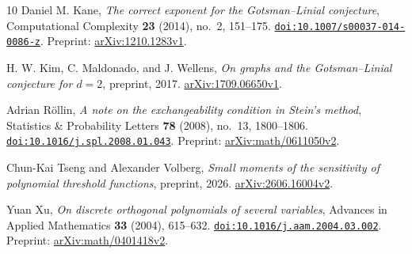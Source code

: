 \begin{thebibliography}{10}
Daniel M. Kane,
\emph{The correct exponent for the Gotsman--Linial conjecture},
Computational Complexity \textbf{23} (2014), no.~2, 151--175.
\href{https://doi.org/10.1007/s00037-014-0086-z}{\nolinkurl{doi:10.1007/s00037-014-0086-z}}.
Preprint: \href{https://arxiv.org/abs/1210.1283v1}{arXiv:1210.1283v1}.

H. W. Kim, C. Maldonado, and J. Wellens,
\emph{On graphs and the Gotsman--Linial conjecture for $d=2$},
preprint, 2017.
\href{https://arxiv.org/abs/1709.06650v1}{arXiv:1709.06650v1}.

Adrian R\"ollin,
\emph{A note on the exchangeability condition in Stein's method},
Statistics \& Probability Letters \textbf{78} (2008), no.~13, 1800--1806.
\href{https://doi.org/10.1016/j.spl.2008.01.043}{\nolinkurl{doi:10.1016/j.spl.2008.01.043}}.
Preprint: \href{https://arxiv.org/abs/math/0611050v2}{arXiv:math/0611050v2}.

Chun-Kai Tseng and Alexander Volberg,
\emph{Small moments of the sensitivity of polynomial threshold functions},
preprint, 2026.
\href{https://arxiv.org/abs/2606.16004v2}{arXiv:2606.16004v2}.

Yuan Xu,
\emph{On discrete orthogonal polynomials of several variables},
Advances in Applied Mathematics \textbf{33} (2004), 615--632.
\href{https://doi.org/10.1016/j.aam.2004.03.002}{\nolinkurl{doi:10.1016/j.aam.2004.03.002}}.
Preprint: \href{https://arxiv.org/abs/math/0401418v2}{arXiv:math/0401418v2}.

\end{thebibliography}
